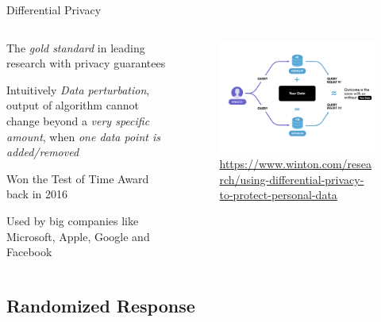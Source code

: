 \documentclass[12pt,aspectratio=169]{beamer}
\begin{document}
\begin{frame}{Differential Privacy}

\begin{columns}[T]
\begin{column}{.5\textwidth}
The \textit{gold standard} in leading research with privacy guarantees

\begin{block}{Intuitively}
\textit{Data perturbation}, output of algorithm cannot change beyond a \textit{very specific amount}, when \textit{one data point is added/removed}
\end{block}

Won the Test of Time Award back in 2016

Used by big companies like Microsoft, Apple, Google and Facebook

    \end{column}
    \begin{column}{.5\textwidth}
\begin{figure}
    \centering
    \includegraphics[width=\linewidth]{figures/dp-definition.png}
    \caption{\tiny \url{https://www.winton.com/research/using-differential-privacy-to-protect-personal-data}}
\end{figure}
    \end{column}
  \end{columns}

\end{frame}


\subsection{Randomized Response}
\end{document}
